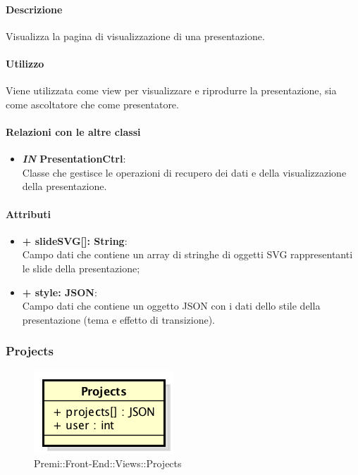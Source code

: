 	\paragraph{Descrizione}
	Visualizza la pagina di visualizzazione di una presentazione.
	
	\paragraph{Utilizzo}
	Viene utilizzata come view per visualizzare e riprodurre la presentazione, sia come ascoltatore che come presentatore.
	
	\paragraph{Relazioni con le altre classi}
	\begin{itemize}
		\item \textbf{\textit{IN} PresentationCtrl}:\\
			Classe che gestisce le operazioni di recupero dei dati e della visualizzazione della presentazione.
	\end{itemize}
	
	\paragraph{Attributi}
	\begin{itemize}
		\item \textbf{+ slideSVG[]: String}:\\
		Campo dati che contiene un array di stringhe di oggetti SVG rappresentanti le slide della presentazione;
		\item \textbf{+ style: JSON}: \\
		Campo dati che contiene un oggetto JSON con i dati dello stile della presentazione (tema e effetto di transizione).
	\end{itemize}
	
	
\subsubsection{Projects}
	\begin{figure}[h]
		\centering
		\includegraphics[width=0.3\linewidth]{img/premi_front_end_views_projects}
		\caption[Premi::Front-End::Views::Projects]{Premi::Front-End::Views::Projects}
	\end{figure}
	
